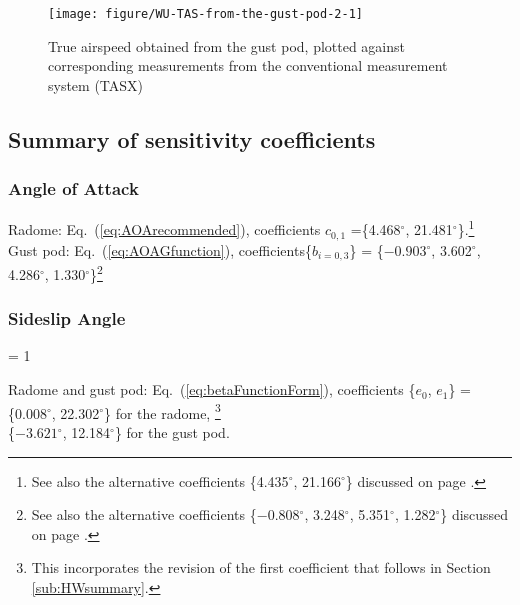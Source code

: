 \documentclass[12pt,twoside,english]{article}\usepackage[]{graphicx}\usepackage[]{color}
\makeatletter
\newenvironment{knitrout}{}{} %
\newlength{\lyxhang}
\newenvironment{hangparagraphs}
     {%
       \ifthenelse{\lengthtest{\parindent > 0pt}}%
         {\setlength{\lyxhang}{\parindent}}%
         {\setlength{\lyxhang}{2em}}%
       \par\begin{hangparas}{\lyxhang}{1}%
     }
     {\end{hangparas}}
\newenvironment{hangparagraphs}
     {%
       \ifthenelse{\lengthtest{\parindent > 0pt}}%
         {\setlength{\lyxhang}{\parindent}}%
         {\setlength{\lyxhang}{2em}}%
       \begin{hangparas}%
     }
     {\end{hangparas}}
\newcommand{\hangpara}{\hangindent \lyxhang \hangafter 1 \noindent}
\newenvironment{hangparas}{\setlength{\parindent}{\z@}
   \everypar={\hangpara}}{\par}
\makeatother
\begin{document}
\begin{knitrout}\footnotesize
{}\color{fgcolor}\begin{figure}

{\centering \texttt{[image: figure/WU-TAS-from-the-gust-pod-2-1]} 

}

\caption[True airspeed obtained from the gust pod, plotted against corresponding measurements from the conventional measurement system (TASX)]{True airspeed obtained from the gust pod, plotted against corresponding measurements from the conventional measurement system (TASX)}\label{fig:TAS-from-the-gust-pod-2}
\end{figure}


\end{knitrout}




\subsection{Summary of sensitivity coefficients\label{sub:CalSummary}}


\subsubsection{Angle of Attack}

Radome: Eq.~(\ref{eq:AOArecommended}), coefficients $c_{0,1}$ =\{4.468$^{\circ}$, 
21.481$^{\circ}$\}.\footnote{See also the alternative coefficients \{4.435$^{\circ}$, 21.166$^{\circ}$\} discussed on page \pageref{coefficients-aoa-all-flt}.}\\ Gust pod: Eq.~(\ref{eq:AOAGfunction}), coefficients\{$b_{i=0,3}$\} = \{\ensuremath{-0.903}$^{\circ}$, 3.602$^{\circ}$, 
4.286$^{\circ}$, 1.330$^{\circ}$\}\footnote{See also the alternative coefficients \{\ensuremath{-0.808}$^{\circ}$, 3.248$^{\circ}$, 5.351$^{\circ}$, 1.282$^{\circ}$\} discussed on page \pageref{aoa-coefficients-GP-all-flt}.}


\subsubsection{Sideslip Angle\label{CalSSsummary}}
\begin{hangparagraphs}
Radome and gust pod: Eq.~(\ref{eq:betaFunctionForm}), coefficients%
\{$e_{0}$, $e_{1}$\} = \\%
\qquad{} \{0.008$^{\circ}$, 22.302$^{\circ}$\} for the radome,%
\footnote{This incorporates the revision of the first coefficient that follows in Section \ref{sub:HWsummary}.}\\%
\qquad{} \{\ensuremath{-3.621}$^{\circ}$, 12.184$^{\circ}$\} for the gust pod.%
\end{hangparagraphs}
\end{document}
